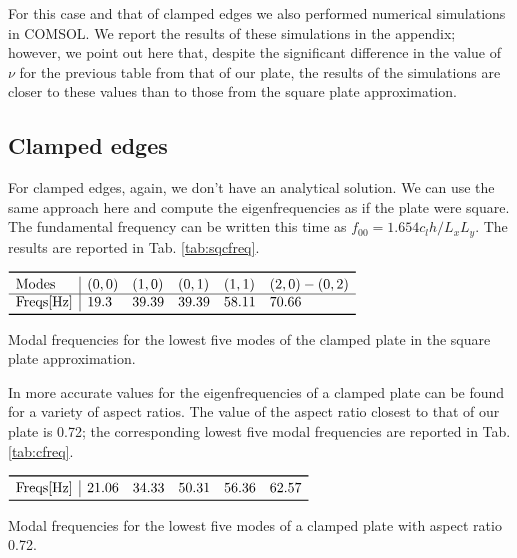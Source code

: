 \documentclass[a4paper]{article}
\begin{document}
For this case and that of clamped edges we also performed numerical simulations in COMSOL. We report the results of these simulations in the appendix; however, we point out here that, despite the significant difference in the value of $\nu$ for the previous table from that of our plate, the results of the simulations are closer to these values than to those from the square plate approximation.

\subsection{Clamped edges}

For clamped edges, again, we don't have an analytical solution. We can use the same approach here and compute the eigenfrequencies as if the plate were square. The fundamental frequency can be written this time as $f_{00} = 1.654c_l h / L_xL_y$. The results are reported in Tab. \ref{tab:sqcfreq}.

\begin{table}[h]
	\centering
	$\begin{array}{l|lllll}
		\toprule
		\text{Modes} & (0,0) & (1,0) & (0,1) & (1,1) & (2,0) - (0,2) \\
		\hline
		\text{Freqs[Hz]} & 19.3 &  39.39 & 
		39.39 &  58.11  & 70.66	\\
		\bottomrule
	\end{array}$
	\caption{Modal frequencies for the lowest five modes of the clamped plate in the square plate approximation.}
	\label{tab:sqcfreq}
\end{table}

In \cite{leissa} more accurate values for the eigenfrequencies of a clamped plate can be found for a variety of aspect ratios. The value of the aspect ratio closest to that of our plate is 0.72; the corresponding lowest five modal frequencies are reported in Tab. \ref{tab:cfreq}.

\begin{table}[h]
	\centering
	$\begin{array}{l|lllll}
		\toprule
		\text{Freqs[Hz]} & 21.06 & 34.33  & 
		50.31 &  56.36  & 62.57\\
		\bottomrule
	\end{array}$
	\caption{Modal frequencies for the lowest five modes of a clamped plate with aspect ratio 0.72.}
	\label{tab:cfreq}
\end{table}




\printbibliography
\end{document}
